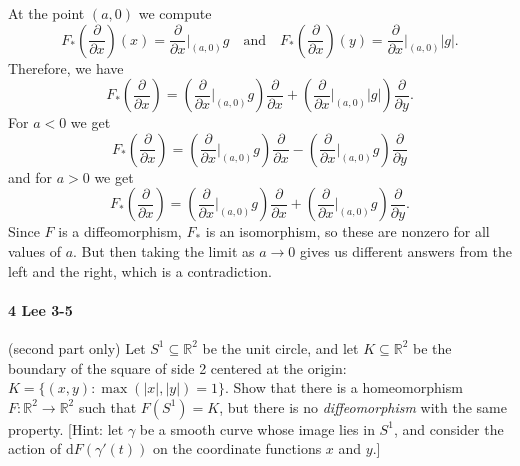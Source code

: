 \documentclass[12pt]{article}
\newlength{\myparskip}
\newenvironment{fullbox}{\begin{lrbox}{\savefullbox}\begin{minipage}{\dimexpr\textwidth-2\fboxsep\relax}\setlength{\parskip}{\myparskip}}{\end{minipage}\end{lrbox}\framebox[\textwidth]{\usebox{\savefullbox}}}
\newenvironment{pbox}[1][]{\begin{fullbox}\def\temp{#1}\ifx\temp\empty\else\paragraph{#1}\phantom{}\fi}{\end{fullbox}}
\theoremstyle{definition}
\newcommand{\isp}[1]{\quad\text{#1}\quad}
\newcommand{\R}{\mathbb{R}}
\newcommand{\<}{\langle}
\renewcommand{\>}{\rangle}
\newcommand{\pdv}[2]{\frac{\partial #1}{\partial #2}}
\begin{document}
At the point $(a, 0)$ we compute
\[\textstyle
    F_*(\pdv{}{x})(x) = \pdv{}{x}\big|_{(a,0)}g
    \isp{and}
    F_*(\pdv{}{x})(y) = \pdv{}{x}\big|_{(a,0)}|g|.
\]
Therefore, we have
\[\textstyle
    F_*(\pdv{}{x}) = \left(\pdv{}{x}\big|_{(a,0)}g\right)\pdv{}{x} + \left(\pdv{}{x}\big|_{(a,0)}|g|\right)\pdv{}{y}.
\]
For $a < 0$ we get 
\[\textstyle
    F_*(\pdv{}{x}) = \left(\pdv{}{x}\big|_{(a,0)}g\right)\pdv{}{x} - \left(\pdv{}{x}\big|_{(a,0)}g\right)\pdv{}{y}
\]
and for $a > 0$ we get
\[\textstyle
    F_*(\pdv{}{x}) = \left(\pdv{}{x}\big|_{(a,0)}g\right)\pdv{}{x} + \left(\pdv{}{x}\big|_{(a,0)}g\right)\pdv{}{y}.
\]
Since $F$ is a diffeomorphism, $F_*$ is an isomorphism, so these are nonzero for all values of $a$.
But then taking the limit as $a \to 0$ gives us different answers from the left and the right, which is a contradiction.




\newpage
\begin{pbox}[4 Lee 3-5]
    (second part only) Let $S^1 \subseteq \R^2$ be the unit circle, and let $K\subseteq \R^2$ be the boundary of the square of side 2 centered at the origin: $K=\{(x,y): \max(|x|,|y|)=1\}$. Show that there is a homeomorphism $F: \R^2\to \R^2$ such that $F(S^1)=K$, but there is no \textit{diffeomorphism} with the same property. [Hint: let $\gamma$ be a smooth curve whose image lies in $S^1$, and consider the action of $\mathrm{d} F(\gamma'(t))$ on the coordinate functions $x$ and $y$.]
\end{pbox}
\end{document}
